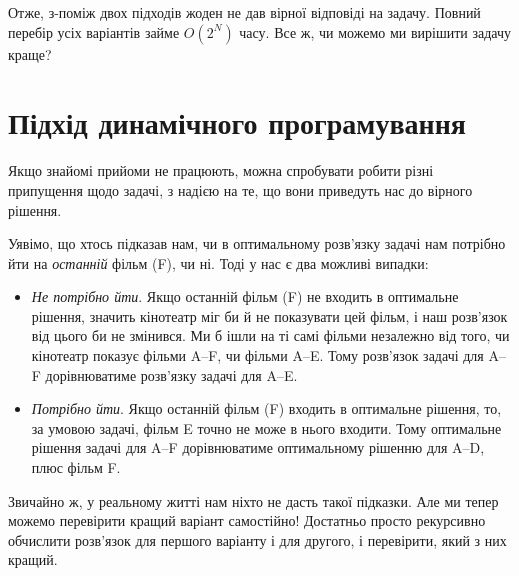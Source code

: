 \documentclass[12pt,a4paper]{report}
\begin{document}
Отже, з-поміж двох підходів жоден не дав вірної відповіді на задачу. Повний перебір усіх варіантів займе \(O(2 ^ N)\) часу. Все ж, чи можемо ми вирішити задачу краще?



\section{Підхід динамічного програмування}

Якщо знайомі прийоми не працюють, можна спробувати робити різні припущення щодо задачі, з надією на те, що вони приведуть нас до вірного рішення.

Уявімо, що хтось підказав нам, чи в оптимальному розв’язку задачі нам потрібно йти на \emph{останній} фільм (F), чи ні. Тоді у нас є два можливі випадки:

\begin{itemize}
    \item \emph{Не потрібно йти}. Якщо останній фільм (F) не входить в оптимальне рішення, значить кінотеатр міг би й не показувати цей фільм, і наш розв’язок від цього би не змінився. Ми б ішли на ті самі фільми незалежно від того, чи кінотеатр показує фільми A--F, чи фільми A--E. Тому розв’язок задачі для A--F дорівнюватиме розв’язку задачі для A--E.
    \item \emph{Потрібно йти}. Якщо останній фільм (F) входить в оптимальне рішення, то, за умовою задачі, фільм E точно не може в нього входити. Тому оптимальне рішення задачі для A--F дорівнюватиме оптимальному рішенню для A--D, плюс фільм F.
\end{itemize}

Звичайно ж, у реальному житті нам ніхто не дасть такої підказки. Але ми тепер можемо перевірити кращий варіант самостійно! Достатньо просто рекурсивно обчислити розв’язок для першого варіанту і для другого, і перевірити, який з них кращий.
\end{document}
